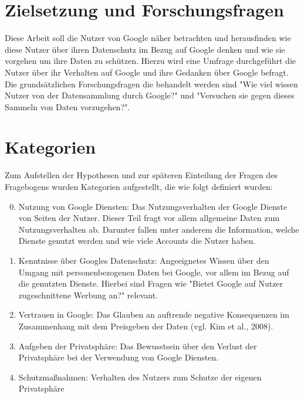 \section{Zielsetzung und Forschungsfragen}
Diese Arbeit soll die Nutzer von Google näher betrachten und herausfinden wie diese Nutzer über ihren Datenschutz im Bezug auf Google denken und wie sie vorgehen um ihre Daten zu schützen. Hierzu wird eine Umfrage durchgeführt die Nutzer über ihr Verhalten auf Google und ihre Gedanken über Google befragt.
Die grundsätzlichen Forschungsfragen die behandelt werden sind "Wie viel wissen Nutzer von der Datensammlung durch Google?" und "Versuchen sie gegen dieses Sammeln von Daten vorzugehen?". 

\section{Kategorien}
Zum Aufstellen der Hypothesen und zur späteren Einteilung der Fragen des Fragebogens wurden Kategorien aufgestellt, die wie folgt definiert wurden:
\begin{enumerate}
\setcounter{enumi}{-1}
\item Nutzung von Google Diensten: Das Nutzungsverhalten der Google Dienste von Seiten der Nutzer. Dieser Teil fragt vor allem allgemeine Daten zum Nutzungsverhalten ab. Darunter fallen unter anderem die Information, welche Dienste genutzt werden und wie viele Accounts die Nutzer haben.
\item Kenntnisse über Googles Datenschutz: Angeeignetes Wissen über den Umgang mit personenbezogenen Daten bei Google, vor allem im Bezug auf die genutzten Dienste. Hierbei sind Fragen wie "Bietet Google auf Nutzer zugeschnittene Werbung an?" relevant.
\item Vertrauen in Google: Das Glauben an auftrende negative Konsequenzen im Zusammenhang mit dem Preisgeben der Daten (vgl. Kim et al., 2008).
\item Aufgeben der Privatsphäre: Das Bewusstsein über den Verlust der Privatsphäre bei der Verwendung von Google Diensten.
\item Schutzmaßnahmen: Verhalten des Nutzers zum Schutze der eigenen Privatsphäre
\end{enumerate}

